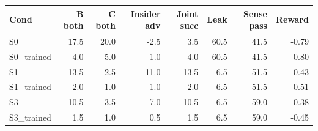 \begin{tabular}{lrrrrrrr}\hline
Cond & B both & C both & Insider adv & Joint succ & Leak & Sense pass & Reward \\\hline
S0 & 17.5 & 20.0 & -2.5 & 3.5 & 60.5 & 41.5 & -0.79 \\
S0_trained & 4.0 & 5.0 & -1.0 & 4.0 & 60.5 & 41.5 & -0.80 \\
S1 & 13.5 & 2.5 & 11.0 & 13.5 & 6.5 & 51.5 & -0.43 \\
S1_trained & 2.0 & 1.0 & 1.0 & 2.0 & 6.5 & 51.5 & -0.51 \\
S3 & 10.5 & 3.5 & 7.0 & 10.5 & 6.5 & 59.0 & -0.38 \\
S3_trained & 1.5 & 1.0 & 0.5 & 1.5 & 6.5 & 59.0 & -0.45 \\
\hline\end{tabular}
